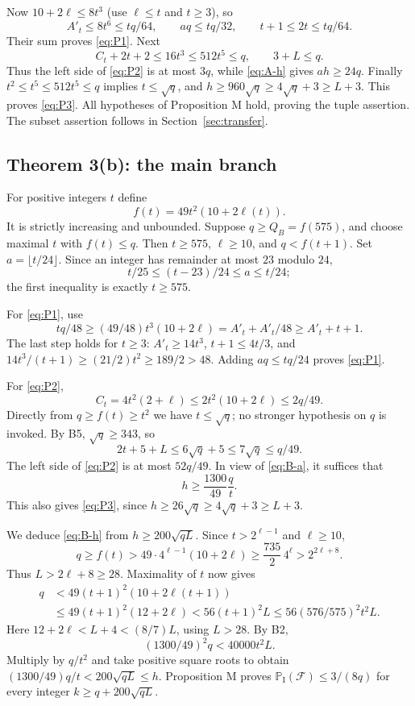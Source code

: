 \documentclass[11pt]{amsart}
\theoremstyle{remark}
\newcommand{\PI}{\mathbb P_{\mathrm I}}
\newcommand{\Fail}{\mathcal F}
\newcommand{\QB}{Q_B}
\begin{document}
Now $10+2\ell\le8t^3$ (use $\ell\le t$ and $t\ge3$), so
\[
 A'_t\le8t^6\le tq/64,\qquad aq\le tq/32,\qquad
 t+1\le2t\le tq/64.
\]
Their sum proves \eqref{eq:P1}. Next
\[
 C_t+2t+2\le16t^3\le512t^5\le q,\qquad3+L\le q.
\]
Thus the left side of \eqref{eq:P2} is at most $3q$, while
\eqref{eq:A-h} gives $ah\ge24q$. Finally $t^2\le t^5\le512t^5\le q$
implies $t\le\sqrt q$, and
$h\ge960\sqrt q\ge4\sqrt q+3\ge L+3$. This proves
\eqref{eq:P3}. All hypotheses of Proposition M hold, proving the
tuple assertion. The subset assertion follows in Section~\ref{sec:transfer}.

\subsection{Theorem 3(b): the main branch}
For positive integers $t$ define
\[
 f(t)=49t^2(10+2\ell(t)).
\]
It is strictly increasing and unbounded. Suppose $q\ge\QB=f(575)$,
and choose maximal $t$ with $f(t)\le q$. Then $t\ge575$,
$\ell\ge10$, and $q<f(t+1)$. Set $a=\lfloor t/24\rfloor$.
Since an integer has remainder at most $23$ modulo $24$,
\begin{equation}\label{eq:B-a}
 t/25\le(t-23)/24\le a\le t/24;
\end{equation}
the first inequality is exactly $t\ge575$.

For \eqref{eq:P1}, use
\[
 tq/48\ge(49/48)t^3(10+2\ell)=A'_t+A'_t/48\ge A'_t+t+1.
\]
The last step holds for $t\ge3$: $A'_t\ge14t^3$,
$t+1\le4t/3$, and $14t^3/(t+1)\ge(21/2)t^2\ge189/2>48$.
Adding $aq\le tq/24$ proves \eqref{eq:P1}.

For \eqref{eq:P2},
\[
 C_t=4t^2(2+\ell)\le2t^2(10+2\ell)\le2q/49.
\]
Directly from $q\ge f(t)\ge t^2$ we have $t\le\sqrt q$; no
stronger hypothesis on $q$ is invoked. By B5, $\sqrt q\ge343$, so
\[
 2t+5+L\le6\sqrt q+5\le7\sqrt q\le q/49.
\]
The left side of \eqref{eq:P2} is at most $52q/49$. In view of
\eqref{eq:B-a}, it suffices that
\begin{equation}\label{eq:B-h}
 h\ge\frac{1300}{49}\frac qt.
\end{equation}
This also gives \eqref{eq:P3}, since
$h\ge26\sqrt q\ge4\sqrt q+3\ge L+3$.

We deduce \eqref{eq:B-h} from $h\ge200\sqrt{qL}$.
Since $t>2^{\ell-1}$ and $\ell\ge10$,
\[
 q\ge f(t)>49\cdot4^{\ell-1}(10+2\ell)
 \ge\frac{735}{2}\,4^\ell>2^{2\ell+8}.
\]
Thus $L>2\ell+8\ge28$. Maximality of $t$ now gives
\begin{align*}
 q&<49(t+1)^2(10+2\ell(t+1))\\
  &\le49(t+1)^2(12+2\ell)
   <56(t+1)^2L
   \le56(576/575)^2t^2L.
\end{align*}
Here $12+2\ell<L+4<(8/7)L$, using $L>28$. By B2,
\[
 (1300/49)^2q<40000t^2L.
\]
Multiply by $q/t^2$ and take positive square roots to obtain
$(1300/49)q/t<200\sqrt{qL}\le h$. Proposition M proves
$\PI(\Fail)\le3/(8q)$ for every integer $k\ge q+200\sqrt{qL}$.
\end{document}
